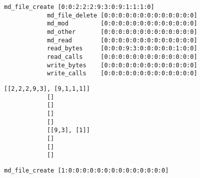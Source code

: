 \documentclass{jhps}
\begin{document}


\begin{listing}
	\noindent\begin{minipage}{\textwidth}
		\noindent\begin{minipage}{0.6\textwidth}
			\begin{lstlisting}[basicstyle=\fontsize{8}{8}\ttfamily]
			md_file_create [0:0:2:2:2:9:3:0:9:1:1:1:0]
			md_file_delete [0:0:0:0:0:0:0:0:0:0:0:0:0]
			md_mod         [0:0:0:0:0:0:0:0:0:0:0:0:0]
			md_other       [0:0:0:0:0:0:0:0:0:0:0:0:0]
			md_read        [0:0:0:0:0:0:0:0:0:0:0:0:0]
			read_bytes     [0:0:0:9:3:0:0:0:0:0:1:0:0]
			read_calls     [0:0:0:0:0:0:0:0:0:0:0:0:0]
			write_bytes    [0:0:0:0:0:0:0:0:0:0:0:0:0]
			write_calls    [0:0:0:0:0:0:0:0:0:0:0:0:0]
			\end{lstlisting}
			\vspace{-2em}
			\label{lst:sim:pm_quant:job_a}
		\end{minipage}
		\noindent\begin{minipage}{0.39\textwidth}
			\begin{lstlisting}[basicstyle=\fontsize{8}{8}\ttfamily]
			[[2,2,2,9,3], [9,1,1,1]]
			[]
			[]
			[]
			[]
			[[9,3], [1]]
			[]
			[]
			[]
			\end{lstlisting}
			\vspace{-2em}
			\label{lst:sim:pm_quant:phases:job_a}
		\end{minipage}
	\end{minipage}
	\noindent\begin{minipage}{\textwidth}
		\noindent\begin{minipage}{0.60\textwidth}
		\begin{lstlisting}[basicstyle=\fontsize{8}{8}\ttfamily]
		md_file_create [1:0:0:0:0:0:0:0:0:0:0:0:0:0:0]

\end{lstlisting}
\end{minipage}
\end{minipage}
\end{listing}
\end{document}
